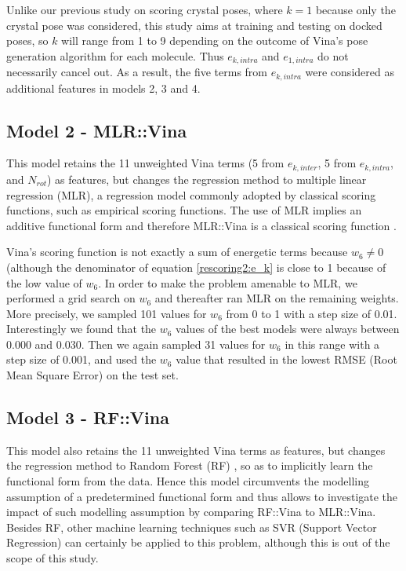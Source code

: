 \documentclass[twocolumn]{bmcart}
\begin{document}
Unlike our previous study \cite{1647} on scoring crystal poses, where $k=1$ because only the crystal pose was considered, this study aims at training and testing on docked poses, so $k$ will range from 1 to 9 depending on the outcome of Vina's pose generation algorithm for each molecule. Thus $e_{k,intra}$ and $e_{1,intra}$ do not necessarily cancel out. As a result, the five terms from $e_{k,intra}$ were considered as additional features in models 2, 3 and 4.

\subsection*{Model 2 - MLR::Vina}

This model retains the 11 unweighted Vina terms (5 from $e_{k,inter}$, 5 from $e_{k,intra}$, and $N_{rot}$) as features, but changes the regression method to multiple linear regression (MLR), a regression model commonly adopted by classical scoring functions, such as empirical scoring functions. The use of MLR implies an additive functional form and therefore MLR::Vina is a classical scoring function \cite{1647}.

Vina's scoring function is not exactly a sum of energetic terms because $w_6\neq0$ (although the denominator of equation \ref{rescoring2:e_k} is close to 1 because of the low value of $w_6$. In order to make the problem amenable to MLR, we performed a grid search on $w_6$ and thereafter ran MLR on the remaining weights. More precisely, we sampled 101 values for $w_6$ from 0 to 1 with a step size of 0.01. Interestingly we found that the $w_6$ values of the best models were always between 0.000 and 0.030. Then we again sampled 31 values for $w_6$ in this range with a step size of 0.001, and used the $w_6$ value that resulted in the lowest RMSE (Root Mean Square Error) on the test set.

\subsection*{Model 3 - RF::Vina}

This model also retains the 11 unweighted Vina terms as features, but changes the regression method to Random Forest (RF) \cite{1309}, so as to implicitly learn the functional form from the data. Hence this model circumvents the modelling assumption of a predetermined functional form and thus allows to investigate the impact of such modelling assumption by comparing RF::Vina to MLR::Vina. Besides RF, other machine learning techniques such as SVR (Support Vector Regression) \cite{1295} can certainly be applied to this problem, although this is out of the scope of this study.
\end{document}
